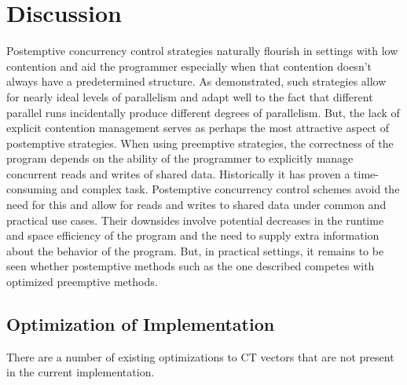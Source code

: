 \chapter{Discussion}

Postemptive concurrency control strategies naturally flourish in settings with
low contention and aid the programmer especially when that contention doesn't
always have a predetermined structure. As demonstrated, such strategies allow
for nearly ideal levels of parallelism and adapt well to the fact that different
parallel runs incidentally produce different degrees of parallelism. But, the
lack of explicit contention management serves as perhaps the most attractive
aspect of postemptive strategies. When using preemptive strategies, the
correctness of the program depends on the ability of the programmer to
explicitly manage concurrent reads and writes of shared data. Historically it
has proven a time-consuming and complex task. Postemptive concurrency control
schemes avoid the need for this and allow for reads and writes to shared data
under common and practical use cases. Their downsides involve potential
decreases in the runtime and space efficiency of the program and the need to
supply extra information about the behavior of the program. But, in practical
settings, it remains to be seen whether postemptive methods such as the one
described competes with optimized preemptive methods.

\section{Optimization of Implementation}
There are a number of existing optimizations to CT vectors that are not present
in the current implementation.

\begin{comment}
TODO: move to implementation
\subsection{Redundant Storage in Nodes}
The size of the code could be reduced by a fairly
large constant factor of approximately $2$ for 32-bit values (such as
\texttt{int}s or \texttt{float}s on most platforms) and a depth of $5$, which
corresponds to a size of $64^5 \approx 1,000,000,000$ using the default branch
size of 64. This factor diminishes to $1.07$ for storing 1024-bit objects and
increases to $3.4$ for packed boolean values by using a \texttt{std::bitset}
instead of a \texttt{std::array} to store values, although this has not been
implemented. In space-sensitive applications where computations are usually
performed on 32-bit numbers, the space savings above do make a difference.
\end{comment}

